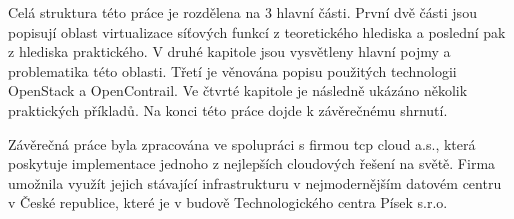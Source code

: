 Celá struktura této práce je rozdělena na 3 hlavní části. První dvě části jsou popisují oblast virtualizace síťových funkcí z teoretického hlediska a poslední pak z hlediska praktického. V druhé kapitole jsou vysvětleny hlavní pojmy a problematika této oblasti. Třetí je věnována popisu použitých technologii OpenStack a OpenContrail. Ve čtvrté kapitole je následně ukázáno několik praktických příkladů. Na konci této práce dojde k závěrečnému shrnutí.

Závěrečná práce byla zpracována ve spolupráci s firmou tcp cloud a.s., která poskytuje implementace jednoho z nejlepších cloudových řešení na světě. Firma umožnila využít jejich stávající infrastrukturu v nejmodernějším datovém centru v České republice, které je v budově Technologického centra Písek s.r.o.



